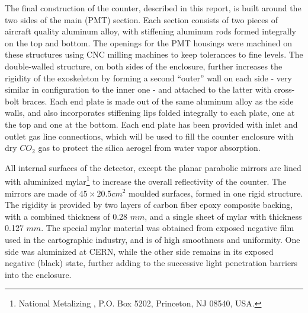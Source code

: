 {The final construction of the counter, described in this report, is built
around the two sides of the main (PMT) section. Each section consists of two pieces
of aircraft quality aluminum alloy, with stiffening aluminum rods formed
integrally on the top and bottom.  
The openings for the PMT housings were machined on these structures using CNC 
milling machines to keep tolerances to fine levels.  
The double-walled structure, on both sides of the enclosure, further increases 
the rigidity of the exoskeleton by forming a second ``outer'' wall on each side 
- very similar in configuration to the inner one - and attached to the latter with 
cross-bolt braces.
Each end plate is made out of the same aluminum alloy as the side walls, and
also incorporates stiffening lips folded integrally to each plate, one at the
top and one at the bottom.  Each end plate has been provided with inlet and
outlet gas line connections, which will be used to fill the counter enclosure
with dry $CO_2$ gas to protect the silica aerogel from water vapor absorption.

All internal surfaces of the detector, except the planar parabolic mirrors
are lined with aluminized 
mylar\footnote{National Metalizing , P.O. Box 5202, Princeton, NJ 08540, USA.} 
to increase the overall reflectivity of the counter.  
The mirrors are made of $45\times 20.5 cm^2$ moulded surfaces, formed in one 
rigid structure. 
The rigidity is provided by two layers of carbon fiber epoxy composite backing, 
with a combined thickness of 0.28 $mm$, and a single sheet of mylar with 
thickness 0.127 $mm$. 
The special mylar material was obtained from exposed negative film used in the
cartographic industry, and is of high smoothness and uniformity. One side was
aluminized at CERN, while the other side remains in its exposed negative
(black) state, further adding to the successive light penetration barriers into
the enclosure.  
 
}
